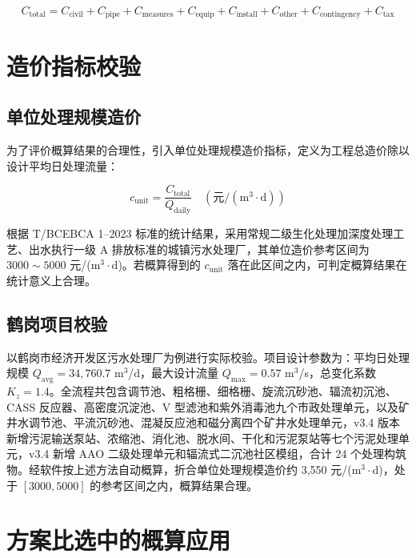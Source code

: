 \documentclass[12pt,a4paper]{ctexart}
\begin{document}
\begin{equation}
\boxed{
C_{\text{total}} = C_{\text{civil}} + C_{\text{pipe}} + C_{\text{measures}} + C_{\text{equip}} + C_{\text{install}} + C_{\text{other}} + C_{\text{contingency}} + C_{\text{tax}}
}
\end{equation}

\section{造价指标校验}

\subsection{单位处理规模造价}

为了评价概算结果的合理性，引入单位处理规模造价指标，定义为工程总造价除以设计平均日处理流量：

\begin{equation}
c_{\text{unit}} = \frac{C_{\text{total}}}{Q_{\text{daily}}} \quad (\text{元}/(\text{m}^3 \cdot \text{d}))
\end{equation}

根据 T/BCEBCA 1--2023 标准的统计结果，采用常规二级生化处理加深度处理工艺、出水执行一级 A 排放标准的城镇污水处理厂，其单位造价参考区间为 $3000 \sim 5000$ 元/(m$^3\cdot$d)。若概算得到的 $c_{\text{unit}}$ 落在此区间之内，可判定概算结果在统计意义上合理。

\subsection{鹤岗项目校验}

以鹤岗市经济开发区污水处理厂为例进行实际校验。项目设计参数为：平均日处理规模 $Q_{\text{avg}} = 34,760.7$ m$^3$/d，最大设计流量 $Q_{\text{max}} = 0.57$ m$^3$/s，总变化系数 $K_z = 1.4$。全流程共包含调节池、粗格栅、细格栅、旋流沉砂池、辐流初沉池、CASS 反应器、高密度沉淀池、V 型滤池和紫外消毒池九个市政处理单元，以及矿井水调节池、平流沉砂池、混凝反应池和磁分离四个矿井水处理单元，v3.4 版本新增污泥输送泵站、浓缩池、消化池、脱水间、干化和污泥泵站等七个污泥处理单元，v3.4 新增 AAO 二级处理单元和辐流式二沉池社区模组，合计 24 个处理构筑物。经软件按上述方法自动概算，折合单位处理规模造价约 3,550 元/(m$^3\cdot$d)，处于 $[3000, 5000]$ 的参考区间之内，概算结果合理。

\section{方案比选中的概算应用}
\end{document}
